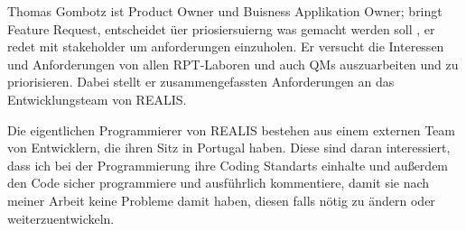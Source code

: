 Thomas Gombotz ist Product Owner und Buisness Applikation Owner; bringt Feature Request, entscheidet üer priosiersuierng was gemacht werden soll , er redet mit stakeholder um anforderungen einzuholen. Er versucht die Interessen und Anforderungen von allen \gls{RPT}-Laboren und auch \glspl{QM} auszuarbeiten und zu priorisieren. Dabei stellt er zusammengefassten Anforderungen an das Entwicklungsteam von \gls{REALIS}.

Die eigentlichen Programmierer von \gls{REALIS} bestehen aus einem externen Team von Entwicklern, die ihren Sitz in Portugal haben. Diese sind daran interessiert, dass ich bei der Programmierung ihre Coding Standarts einhalte und außerdem den Code sicher programmiere und ausführlich kommentiere, damit sie nach meiner Arbeit keine Probleme damit haben, diesen falls nötig zu ändern oder weiterzuentwickeln. 